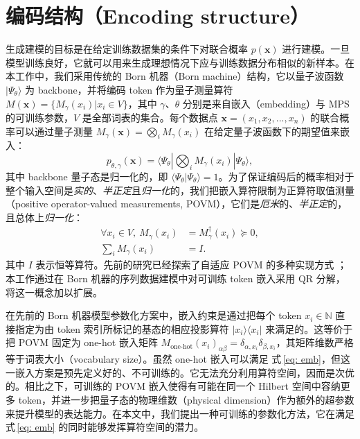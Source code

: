 \documentclass[aps,prb,twocolumn,superscriptaddress]{revtex4-2}
\newcommand{\bra}[1]{\langle #1|}
\newcommand{\ket}[1]{|#1 \rangle}
\newcommand{\braket}[2]{\langle #1|#2 \rangle}
\newcommand{\dsN}{\mathbb{N}}
\newcommand{\vect}[1]{{\bm{#1}}}
\newcommand{\eqnref}[1]{式\,\eqref{#1}}
\begin{document}
\section{编码结构（Encoding structure）}

生成建模的目标是在给定训练数据集的条件下对联合概率 $p(\vect{x})$ 进行建模。一旦模型训练良好，它就可以用来生成理想情况下应与训练数据分布相似的新样本。在本工作中，我们采用传统的 Born 机器（Born machine）结构，它以量子波函数 $\ket{\Psi_\theta}$ 为 backbone，并将编码 token 作为量子测量算符 $M(\vect{x})=\{M_{\gamma}(x_i)|x_i\in V\}$，其中 $\gamma$、$\theta$ 分别是来自嵌入（embedding）与 MPS 的可训练参数，$V$ 是全部词表的集合。每个数据点 $\vect{x}=(x_1,x_2,...,x_n)$ 的联合概率可以通过量子测量 $M_\gamma(\vect{x})=\bigotimes_{i}M_{\gamma}(x_i)$ 在给定量子波函数下的期望值来嵌入：
\begin{equation}\label{eq: P}
    p_{\theta, \gamma}(\vect{x})=\bra{\Psi_\theta}\bigotimes_{i}M_{\gamma}(x_i)\ket{\Psi_\theta},
\end{equation}
其中 backbone 量子态是归一化的，即 $\braket{\Psi_\theta}{\Psi_\theta}=1$。为了保证编码后的概率相对于整个输入空间是\textit{实的}、\textit{半正定}且\textit{归一化}的，我们把嵌入算符限制为正算符取值测量（positive operator-valued measurements, POVM），它们是\textit{厄米}的、\textit{半正定}的，且总体上\textit{归一化}：
\begin{equation}\label{eq: emb}
\begin{split}
    \forall x_{i}\in V,\ M_{\gamma}(x_i)&=M^{\dagger}_{\gamma}(x_i)\succeq 0,\\
    \sum_{i}M_{\gamma}(x_i)&=I.
\end{split}
\end{equation}
其中 $I$ 表示恒等算符。先前的研究已经探索了自适应 POVM 的多种实现方式 \cite{2022arXiv220807817G, 2023arXiv230315353Z, 2021PRXQ....2d0342G}；本工作通过在 Born 机器的序列数据建模中对可训练 token 嵌入采用 QR 分解，将这一概念加以扩展。


在先前的 Born 机器模型参数化方案中，嵌入约束是通过把每个 token $x_i\in\dsN$ 直接指定为由 token 索引所标记的基态的相应投影算符 $\ket{x_i}\bra{x_i}$ 来满足的\cite{PhysRevX.8.031012}。这等价于把 POVM 固定为 one-hot 嵌入矩阵 $M_\text{one-hot}(x_i)_{\alpha\beta}=\delta_{\alpha,x_i}\delta_{\beta,x_i}$，其矩阵维数严格等于词表大小（vocabulary size）。虽然 one-hot 嵌入可以满足 \eqnref{eq: emb}，但这一嵌入方案是预先定义好的、不可训练的。它无法充分利用算符空间，因而是次优的。相比之下，可训练的 POVM 嵌入使得有可能在同一个 Hilbert 空间中容纳更多 token，并进一步把量子态的物理维数（physical dimension）作为额外的超参数来提升模型的表达能力。在本文中，我们提出一种可训练的参数化方法，它在满足 \eqnref{eq: emb} 的同时能够发挥算符空间的潜力。
\end{document}
